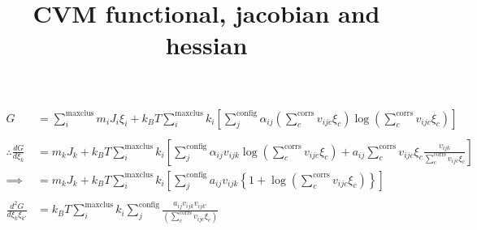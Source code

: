 \documentclass[fleqn]{article}
\title{CVM functional, jacobian and hessian}
\date{}
\begin{document}
\maketitle
\begin{align*}
    G &= \sum_i^\text{maxclus} m_iJ_i\xi_i + k_BT \sum_i^\text{maxclus} k_i\left[\sum_j^\text{config}\alpha_{ij}\left(\sum_c^\text{corrs} v_{ijc}\xi_c\right)\log\left(\sum_c^\text{corrs} v_{ijc}\xi_c\right)\right] \\
    &\\
    \therefore \frac{dG}{d\xi_k} &=  m_kJ_k + k_BT \sum_i^\text{maxclus} k_i\left[\sum_j^\text{config}\alpha_{ij}v_{ijk}\log\left(\sum_c^\text{corrs} v_{ijc}\xi_c\right) + a_{ij}\sum_c^\text{corrs} v_{ijc}\xi_c\frac{v_{ijk}}{\sum_c^\text{corrs} v_{ijc}\xi_c}\right]\\
    \implies &= m_kJ_k + k_BT \sum_i^\text{maxclus}k_i\left[\sum_j^\text{config}a_{ij}v_{ijk}\left\{1 + \log\left(\sum_c^\text{corrs} v_{ijc}\xi_c\right)\right\}\right]\\
    &\\
    \frac{d^2G}{d\xi_k\xi_{k'}} &= k_BT \sum_i^\text{maxclus}k_i\sum_j^\text{config} \frac{a_{ij}v_{ijk}v_{ijk'}}{\left(\sum_c^\text{corrs} v_{ijc}\xi_c\right)}
\end{align*}

\end{document}
